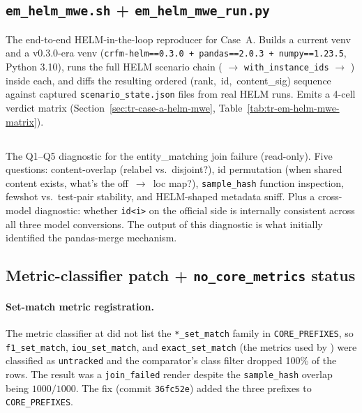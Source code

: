 \documentclass[11pt]{article}
\begin{document}
\subsection{\texorpdfstring{\texttt{em\_helm\_mwe.sh} + \texttt{em\_helm\_mwe\_run.py}}{em\_helm\_mwe.sh + em\_helm\_mwe\_run.py}}
\label{sec:tr-tooling-em-helm-mwe}

The end-to-end HELM-in-the-loop reproducer for Case~A.
Builds a current venv and a v0.3.0-era venv
  (\texttt{crfm-helm==0.3.0 + pandas==2.0.3 + numpy==1.23.5},
  Python 3.10), runs the full HELM scenario chain
  ( $\to$
  \texttt{with\_instance\_ids} $\to$
  ) inside each, and diffs the
  resulting ordered \mbox{(rank, id, content\_sig)} sequence against
  captured \texttt{scenario\_state.json} files from real HELM runs.
Emits a 4-cell verdict matrix
  (Section~\ref{sec:tr-case-a-helm-mwe},
  Table~\ref{tab:tr-em-helm-mwe-matrix}).

\subsection{\texorpdfstring{}{diagnose\_entity\_matching\_join.py}}
\label{sec:tr-tooling-em-diagnose}

The Q1--Q5 diagnostic for the entity\_matching join failure
  (read-only).
Five questions: content-overlap (relabel vs.\ disjoint?), id
  permutation (when shared content exists, what's the off~$\to$~loc
  map?), \texttt{sample\_hash} function inspection, fewshot vs.\
  test-pair stability, and HELM-shaped metadata sniff.
Plus a cross-model diagnostic: whether \texttt{id<i>} on the
  official side is internally consistent across all three model
  conversions.
The output of this diagnostic is what initially identified the
  pandas-merge mechanism.

\subsection{\texorpdfstring{Metric-classifier patch + \texttt{no\_core\_metrics} status}{Metric-classifier patch + no\_core\_metrics status}}
\label{sec:tr-tooling-classifier}

\paragraph{Set-match metric registration.}
The metric classifier at  did
  not list the \texttt{*\_set\_match} family in
  \texttt{CORE\_PREFIXES}, so \texttt{f1\_set\_match},
  \texttt{iou\_set\_match}, and \texttt{exact\_set\_match} (the
  metrics used by ) were
  classified as \texttt{untracked} and the comparator's class
  filter dropped 100\% of the rows.
The result was a \texttt{join\_failed} render despite the
  \texttt{sample\_hash} overlap being $1000/1000$.
The fix (commit \texttt{36fc52e}) added the three prefixes to
  \texttt{CORE\_PREFIXES}.
\end{document}
